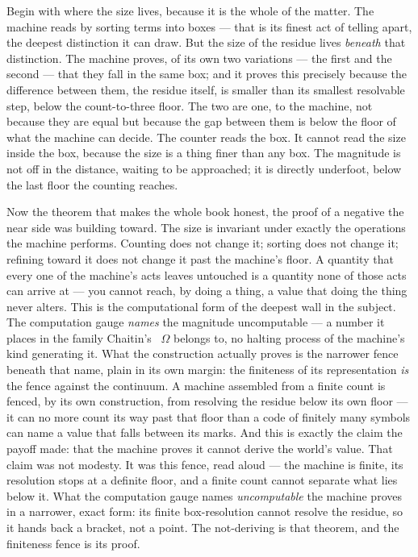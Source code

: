 Begin with where the size lives, because it is the whole of the matter. The machine reads by sorting terms into boxes ---
that is its finest act of telling apart, the deepest distinction it can draw. But the size of the residue lives
\emph{beneath} that distinction. The machine proves, of its own two variations --- the first and the second --- that they
fall in the same box; and it proves this precisely because the difference between them, the residue itself, is smaller
than its smallest resolvable step, below the count-to-three floor. The two are one, to the machine,
not because they are equal but because the gap between them is below the floor of what the machine can decide. The counter
reads the box. It cannot read the size inside the box, because the size is a thing finer than any box. The magnitude is
not off in the distance, waiting to be approached; it is directly underfoot, below the last floor the counting reaches.

Now the theorem that makes the whole book honest, the proof of a negative the near side was building toward. The size is
invariant under exactly the operations the machine performs. Counting does not change it; sorting does not change it;
refining toward it does not change it past the machine's floor. A quantity that every one of the machine's acts
leaves untouched is a quantity none of those acts can arrive at --- you cannot reach, by doing a thing, a value that doing
the thing never alters. This is the computational form of the deepest wall in the subject. The computation gauge \emph{names} the magnitude
uncomputable --- a number it places in the family Chaitin's~\cite{chaitin1974} $\Omega$ belongs to, no halting process of the machine's kind generating it. What the construction actually proves is the narrower fence beneath that name, plain in its own margin: the finiteness of its representation \emph{is} the fence
against the continuum. A machine assembled from a finite count is fenced, by its own construction, from resolving the
residue below its own floor --- it can no more count its way past that floor than a code of finitely many symbols can name a value
that falls between its marks. And this is exactly the claim the payoff made: that the machine proves it cannot derive the
world's value. That claim was not modesty. It was this fence, read aloud --- the machine is
finite, its resolution stops at a definite floor, and a finite count cannot separate what lies below it. What the computation gauge names \emph{uncomputable} the machine proves in a narrower, exact form: its finite box-resolution cannot resolve the residue, so it hands back a bracket, not a point. The not-deriving is that theorem, and the finiteness fence is its
proof.

